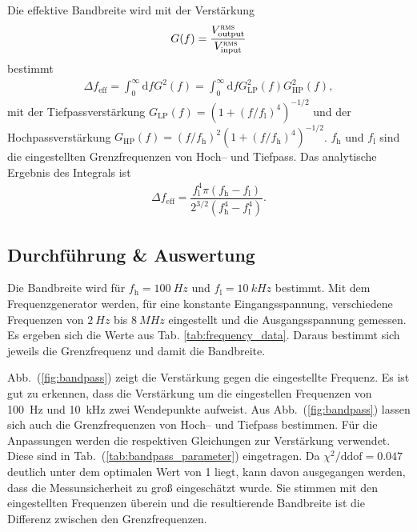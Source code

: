 \documentclass[sn-mathphys-num,iicol]{sn-jnl}
\theoremstyle{thmstyleone}
\theoremstyle{thmstyletwo}
\theoremstyle{thmstylethree}
\newcommand{\td}{\text{d}}
\begin{document}
Die effektive Bandbreite wird mit der Verstärkung
\begin{align}
	G(f)=\dfrac{V^\textsc{rms}_\text{output}}{V^\textsc{rms}_\text{input}}
\end{align}
bestimmt
\begin{align}
	\Delta f_\text{eff}=\int_{0}^{\infty}\td fG^2(f)=\int_{0}^{\infty}\td fG_\text{LP}^2(f)G_\text{HP}^2(f)
	,\end{align}
mit der Tiefpassverstärkung $G_\text{LP}(f)=\left(1+(f/f_\text{l})^4\right)^{-1/2}$ und der Hochpassverstärkung $G_\text{HP}\left(f\right)=\left(f/f_\text{h}\right)^2\left(1+(f/f_\text{h})^4\right)^{-1/2}$.
$f_\text{h}$ und $f_\text{l}$ sind die eingestellten Grenzfrequenzen von Hoch-- und Tiefpass.
Das analytische Ergebnis des Integrals ist
\begin{align}
	\Delta f_\text{eff}=\dfrac{f_\text{l}^4\pi \left(f_\text{h}-f_\text{l}\right)}{2^{3/2}\left(f_\text{h}^4-f_\text{l}^4\right)}
	.\end{align}

\subsection{Durchführung \& Auswertung} \label{sec:bandbreite}
Die Bandbreite wird für $f_\text{h}=\SI{100}{Hz}$ und $f_\text{l}=\SI{10}{kHz}$ bestimmt.
Mit dem Frequenzgenerator werden, für eine konstante Eingangsspannung, verschiedene Frequenzen von $\SI{2}{Hz}$ bis $\SI{8}{MHz}$ eingestellt und die Ausgangsspannung gemessen. Es ergeben sich die Werte aus Tab. \ref{tab:frequency_data}.
Daraus bestimmt sich jeweils die Grenzfrequenz und damit die Bandbreite.

Abb.\ (\ref{fig:bandpass}) zeigt die Verstärkung gegen die eingestellte Frequenz. Es ist gut zu erkennen, dass die Verstärkung um die eingestellen Frequenzen von \SI{100}{Hz} und \SI{10}{\kilo Hz} zwei Wendepunkte aufweist.
Aus Abb.\ (\ref{fig:bandpass}) lassen sich auch die Grenzfrequenzen von Hoch-- und Tiefpass bestimmen. Für die Anpassungen werden die respektiven Gleichungen zur Verstärkung verwendet. 
Diese sind in Tab.\ (\ref{tab:bandpass_parameter}) eingetragen. Da $\chi^2/\text{ddof}=\SI{0.047}{}$ deutlich unter dem optimalen Wert von 1 liegt, kann davon ausgegangen werden, dass die Messunsicherheit zu groß eingeschätzt wurde.
Sie stimmen mit den eingestellten Frequenzen überein und die resultierende Bandbreite ist die Differenz zwischen den Grenzfrequenzen.
\end{document}
